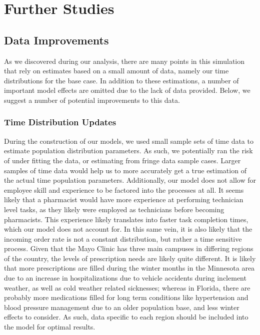 \documentclass[10pt]{report}            %
\begin{document}
\section*{Further Studies}
\subsection*{Data Improvements}
As we discovered during our analysis, there are many points in this simulation that rely on estimates based on a small amount of data, namely our time distributions for the base case. In addition to these estimations, a number of important model effects are omitted due to the lack of data provided. Below, we suggest a number of potential improvements to this data.
\subsubsection*{Time Distribution Updates}
During the construction of our models, we used small sample sets of time data to estimate population distribution parameters. As such, we potentially ran the risk of under fitting the data, or estimating from fringe data sample cases. Larger samples of time data would help us to more accurately get a true estimation of the actual time population parameters.  Additionally, our model does not allow for employee skill and experience to be factored into the processes at all. It seems likely that a pharmacist would have more experience at performing technician level tasks, as they likely were employed as technicians before becoming pharmacists. This experience likely translates into faster task completion times, which our model does not account for. In this same vein, it is also likely that the incoming order rate is not a constant distribution, but rather a time sensitive process. Given that the Mayo Clinic has three main campuses in differing regions of the country, the levels of prescription needs are likely quite different. It is likely that more prescriptions are filled during the winter months in the Minnesota area due to an increase in hospitalizations due to vehicle accidents during inclement weather, as well as cold weather related sicknesses; whereas in Florida, there are probably more medications filled for long term conditions like hypertension and blood pressure management due to an older population base, and less winter effects to consider. As such, data specific to each region should be included into the model for optimal results.
\end{document}
